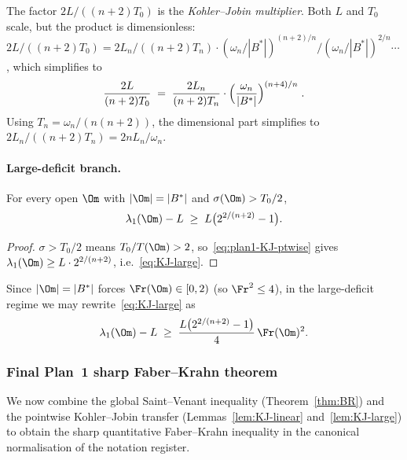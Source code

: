 \begin{remark}\label{rem:multiplier}
The factor $2L/((n+2)T_0)$ is the \emph{Kohler--Jobin multiplier}.
Both $L$ and $T_0$ scale, but the product is dimensionless:
$2L/((n+2)T_0)=2L_n/((n+2)T_n)\cdot(\omega_n/|B^*|)^{(n+2)/n}/(\omega_n/|B^*|)^{2/n}\cdots$,
which simplifies to
\begin{equation}\label{eq:multiplier-explicit}
\frac{2L}{(n+2)T_0}
\;=\;
\frac{2L_n}{(n+2)T_n}\cdot\Bigl(\frac{\omega_n}{|B^*|}\Bigr)^{(n+4)/n}\;.
\end{equation}
Using $T_n=\omega_n/(n(n+2))$, the dimensional part simplifies to
$2L_n/((n+2)T_n)=2nL_n/\omega_n$.
\end{remark}

\paragraph{Large-deficit branch.}

\begin{lemma}\label{lem:KJ-large}
For every open $\Om$ with $|\Om|=|B^*|$ and $\sigma(\Om)>T_0/2$,
\begin{equation}\label{eq:KJ-large}
\lambda_1(\Om)-L
\;\ge\; L\bigl(2^{2/(n+2)}-1\bigr).
\end{equation}
\end{lemma}

\begin{proof}
$\sigma>T_0/2$ means $T_0/T(\Om)>2$, so~\eqref{eq:plan1-KJ-ptwise} gives
$\lambda_1(\Om)\ge L\cdot 2^{2/(n+2)}$, i.e.~\eqref{eq:KJ-large}.
\end{proof}

Since $|\Om|=|B^*|$ forces $\Fr(\Om)\in[0,2)$ (so $\Fr^2\le 4$),
in the large-deficit regime we may rewrite~\eqref{eq:KJ-large} as
\begin{equation}\label{eq:KJ-large-Fr}
\lambda_1(\Om)-L
\;\ge\; \frac{L\bigl(2^{2/(n+2)}-1\bigr)}{4}\,\Fr(\Om)^2.
\end{equation}

\subsubsection{Final Plan~1 sharp Faber--Krahn theorem}
\label{ssec:plan1-final}

We now combine the global Saint--Venant inequality
(Theorem~\ref{thm:BR}) and the pointwise Kohler--Jobin transfer
(Lemmas~\ref{lem:KJ-linear} and~\ref{lem:KJ-large}) to obtain the
sharp quantitative Faber--Krahn inequality in the canonical
normalisation of the notation register.

